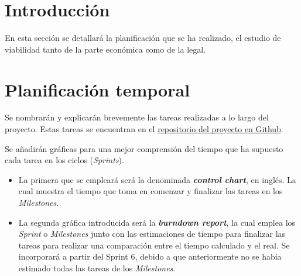 
\section{Introducción}
En esta sección se detallará la planificación que se ha realizado, el estudio de viabilidad tanto de la parte económica como de la legal. 

\section{Planificación temporal}
Se nombrarán y explicarán brevemente las tareas realizadas a lo largo del proyecto. Estas tareas se encuentran en el \href{https://github.com/dbo1001/Gestor-TFG-2021}{repositorio del proyecto en Github}. 

Se añadirán gráficas para una mejor comprensión del tiempo que ha supuesto cada tarea en los ciclos (\emph{Sprints}). 
\begin{itemize}
	\tightlist
	\item La primera que se empleará será la denominada \textbf{\emph{control chart}}, en inglés. La cual muestra el tiempo que toma en comenzar y finalizar las tareas en los \emph{Milestones}.
	
	\item La segunda gráfica introducida será la \textbf{\emph{burndown report}}, la cual emplea los \emph{Sprint} o \emph{Milestones} junto con las estimaciones de tiempo para finalizar las tareas para realizar una comparación entre el tiempo calculado y el real. Se incorporará a partir del Sprint 6, debido a que anteriormente no se había estimado todas las tareas de los \emph{Milestones}.
\end{itemize}

